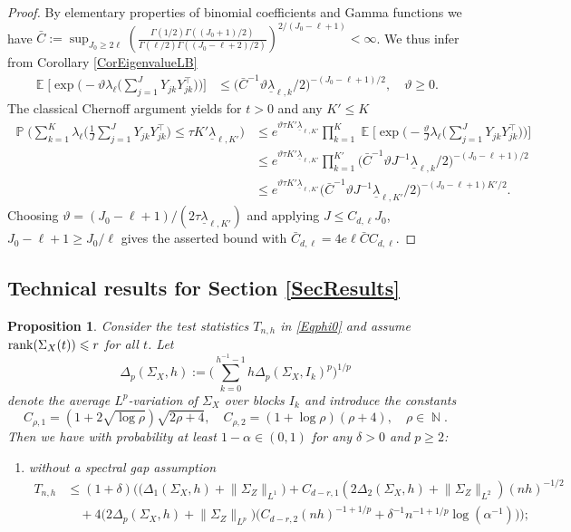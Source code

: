 \documentclass[preprint,aos]{imsart}
\numberwithin{equation}{section}
\newtheorem{proposition}[satz]{Proposition}
\theoremstyle{remark}
\DeclareMathOperator{\E}{{\mathbb E}}
\DeclareMathOperator{\N}{{\mathbb N}}
\DeclareMathOperator{\PP}{{\mathbb P}}
\renewcommand{\theta}{\vartheta}
\providecommand{\norm}[1]{\lVert #1 \rVert}
\renewcommand{\le}{\leqslant}
\renewcommand{\ge}{\geqslant}
\begin{document}
\begin{appendix}
\begin{proof}
\begin{comment}
\end{comment}
By elementary properties of binomial coefficients and Gamma functions we have $\bar C:=\sup_{J_0\ge2\ell}(\frac{ \Gamma(1/2)\Gamma((J_0+1)/2)} {\Gamma(\ell/2)\Gamma((J_0-\ell+2)/2)})^{2/(J_0-\ell+1)}<\infty$. We thus infer from Corollary \ref{CorEigenvalueLB}
\begin{align*}
\E\Big[\exp\Big(-\theta \lambda_{\ell}\Big(\sum_{j=1}^JY_{jk}Y_{jk}^\top\Big)\Big)\Big]
&\le \Big(\bar C^{-1}\theta \underline\lambda_{\ell,k}/2
\Big)^{-(J_0-\ell+1)/2},\quad \theta\ge 0.
\end{align*}
The classical Chernoff argument yields for $t>0$ and any $K'\le K$
\begin{align*}
\PP\Big(\sum_{k=1}^K \lambda_\ell\Big(\frac1{J}\sum_{j=1}^JY_{jk}Y_{jk}^\top\Big)\le \tau K'\underline\lambda_{\ell,K'}\Big)
&\le e^{\theta \tau K'\underline\lambda_{\ell,K'}  }\prod_{k=1}^{K}\E\Big[\exp\Big(-\frac \theta J \lambda_\ell\Big(\sum_{j=1}^JY_{jk}Y_{jk}^\top\Big)\Big)\Big]\\
&\le e^{\theta \tau K'\underline\lambda_{\ell,K'}}\prod_{k=1}^{K'} \Big(\bar C^{-1}\theta J^{-1}\underline\lambda_{\ell,k}/2\Big)^{-(J_0-\ell+1)/2}\\
&\le e^{\theta \tau K'\underline\lambda_{\ell,K'}}\Big(\bar C^{-1}\theta J^{-1}\underline\lambda_{\ell,K'}/2\Big)^{-(J_0-\ell+1)K'/2}.
\end{align*}
Choosing $\theta=(J_0-\ell+1)/(2\tau\underline\lambda_{\ell,K'})$ and applying $J\le C_{d,\ell}J_0$, $J_0-\ell+1\ge J_0/\ell$ gives the asserted bound with $\bar C_{d,\ell}=4e\ell \bar C C_{d,\ell}$.
\end{proof}

\subsection{Technical results for Section \ref{SecResults}} \label{AppTechnical3}

\begin{proposition}\label{PropCalcCritVal}
Consider the test statistics  $T_{n,h}$ in \eqref{Eqphi0} and assume $\rank(\Sigma_X(t))\le r$ for all $t$. Let
\[\Delta_p(\Sigma_X,h):=\Big(\sum_{k=0}^{h^{-1}-1}h\Delta_p(\Sigma_X,I_k)^p\Big)^{1/p}\]
denote the average $L^p$-variation of $\Sigma_X$ over blocks $I_k$ and introduce the constants
\[C_{\rho,1}=(1+2\sqrt{\log \rho} ) \sqrt{2\rho+4},\quad C_{\rho,2}=(1+\log\rho)(\rho+4),\quad\rho\in\N.\]
Then we have with probability at least $1-\alpha\in(0,1)$ for any $\delta>0$ and $p\ge 2$:
\begin{enumerate}
\item without a spectral gap assumption
\begin{align*}
T_{n,h}
& \le (1+\delta)\Big( \big(\Delta_1(\Sigma_X,h)+\norm{\Sigma_Z}_{L^1}\big)
  +C_{d-r,1}(2\Delta_2(\Sigma_X,h)+\norm{\Sigma_{Z}}_{L^2})(nh)^{-1/2}\\
 &\quad +4
 \big(2\Delta_p(\Sigma_X,h)+\norm{\Sigma_Z}_{L^p}\big)\big(C_{d-r,2}(nh)^{-1+1/p}+\delta^{-1}n^{-1+1/p}\log(\alpha^{-1})\big)\Big);
\end{align*}


\end{enumerate}
\end{proposition}
\end{appendix}
\end{document}
